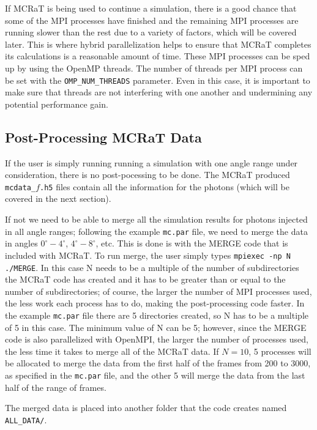 \documentclass[12pt,a4paper]{article}
\begin{document}
 If MCRaT is being used to continue a simulation, there is a good chance that some of the MPI processes have finished and the remaining MPI processes are running slower than the rest due to a variety of factors, which will be covered later. This is where hybrid parallelization helps to ensure that MCRaT completes its calculations is a reasonable amount of time. These MPI processes can be sped up by using the OpenMP threads. The number of threads per MPI process can be set with the \texttt{OMP\_NUM\_THREADS} parameter. Even in this case, it is important to make sure that threads are not interfering with one another and undermining any potential performance gain.
 
 \subsection{Post-Processing MCRaT Data}
 If the user is simply running running a simulation with one angle range under consideration, there is no post-pocessing to be done. The MCRaT produced \texttt{mcdata\_$f$.h5} files contain all the information for the photons (which will be covered in the next section).
 
 If not we need to be able to merge all the simulation results for photons injected in all angle ranges; following the example \texttt{mc.par} file, we need to merge the data in angles $0^\circ-4^\circ$, $4^\circ-8^\circ$, etc. This is done is with the MERGE code that is included with MCRaT. To run merge, the user simply types \texttt{mpiexec -np N ./MERGE}. In this case N needs to be a multiple of the number of subdirectories the MCRaT code has created and it has to be greater than or equal to the number of subdirectories; of course, the larger the number of MPI processes used, the less work each process has to do, making the post-processing code faster. In the example \texttt{mc.par} file there are 5 directories created, so N has to be a multiple of 5 in this case. The minimum value of N can be 5; however, since the MERGE code is also parallelized with OpenMPI, the larger the number of processes used, the less time it takes to merge all of the MCRaT data.  If $N=10$, 5 processes will be allocated to merge the data from the first half of the frames from 200 to 3000, as specified in the \texttt{mc.par} file, and the other 5 will merge the data from the last half of the range of frames.
 
 The merged data is placed into another folder that the code creates named \texttt{ALL\_DATA/}. \newline
 
\end{document}
